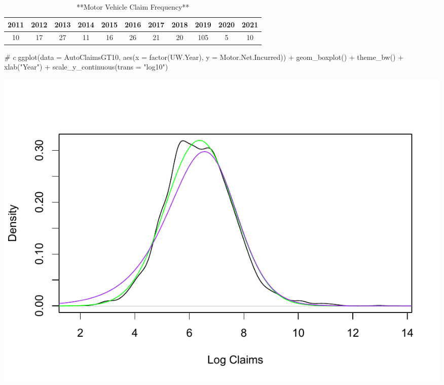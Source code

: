 \documentclass[
]{book}
\newenvironment{Shaded}{\begin{snugshade}}{\end{snugshade}}
\newcommand{\AttributeTok}[1]{\textcolor[rgb]{0.77,0.63,0.00}{#1}}
\newcommand{\CommentTok}[1]{\textcolor[rgb]{0.56,0.35,0.01}{\textit{#1}}}
\newcommand{\DecValTok}[1]{\textcolor[rgb]{0.00,0.00,0.81}{#1}}
\newcommand{\FunctionTok}[1]{\textcolor[rgb]{0.00,0.00,0.00}{#1}}
\newcommand{\NormalTok}[1]{#1}
\newcommand{\OtherTok}[1]{\textcolor[rgb]{0.56,0.35,0.01}{#1}}
\newcommand{\SpecialCharTok}[1]{\textcolor[rgb]{0.00,0.00,0.00}{#1}}
\newcommand{\StringTok}[1]{\textcolor[rgb]{0.31,0.60,0.02}{#1}}
\begin{document}
\begin{table}

\caption{\label{tab:unnamed-chunk-22}**Motor Vehicle Claim Frequency**}
\centering
\begin{tabular}[t]{c|c|c|c|c|c|c|c|c|c|c}
\hline
2011 & 2012 & 2013 & 2014 & 2015 & 2016 & 2017 & 2018 & 2019 & 2020 & 2021\\
\hline
10 & 17 & 27 & 11 & 16 & 26 & 21 & 20 & 105 & 5 & 10\\
\hline
\end{tabular}
\end{table}

\begin{Shaded}
\begin{Highlighting}[]
\CommentTok{\# c}
\FunctionTok{ggplot}\NormalTok{(}\AttributeTok{data =}\NormalTok{ AutoClaimsGT10, }\FunctionTok{aes}\NormalTok{(}\AttributeTok{x =} \FunctionTok{factor}\NormalTok{(UW.Year), }\AttributeTok{y =}\NormalTok{ Motor.Net.Incurred)) }\SpecialCharTok{+}
    \FunctionTok{geom\_boxplot}\NormalTok{() }\SpecialCharTok{+} \FunctionTok{theme\_bw}\NormalTok{() }\SpecialCharTok{+} \FunctionTok{xlab}\NormalTok{(}\StringTok{"Year"}\NormalTok{) }\SpecialCharTok{+} \FunctionTok{scale\_y\_continuous}\NormalTok{(}\AttributeTok{trans =} \StringTok{"log10"}\NormalTok{)}
\end{Highlighting}
\end{Shaded}

\begin{center}\includegraphics[width=0.7\linewidth]{LossDataAnalytics_files/figure-latex/unnamed-chunk-22-1} \end{center}

\begin{Shaded}
\end{Shaded}
\end{document}
